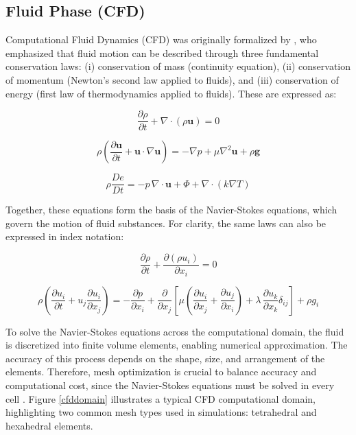 \subsection{Fluid Phase (CFD)}

Computational Fluid Dynamics (CFD) was originally formalized by \cite{Roache1972}, who emphasized that fluid motion can be described through three fundamental conservation laws: (i) conservation of mass (continuity equation), (ii) conservation of momentum (Newton's second law applied to fluids), and (iii) conservation of energy (first law of thermodynamics applied to fluids). These are expressed as:

\begin{equation}
    \frac{\partial \rho}{\partial t} + \nabla \cdot (\rho \mathbf{u}) = 0
\end{equation}

\begin{equation}
    \rho \left( \frac{\partial \mathbf{u}}{\partial t} + \mathbf{u} \cdot \nabla \mathbf{u} \right) 
    = -\nabla p + \mu \nabla^2 \mathbf{u} + \rho \mathbf{g}
\end{equation}

\begin{equation}
    \rho \frac{De}{Dt} = -p \, \nabla \cdot \mathbf{u} + \Phi + \nabla \cdot (k \nabla T)
\end{equation}

Together, these equations form the basis of the Navier-Stokes equations, which govern the motion of fluid substances. For clarity, the same laws can also be expressed in index notation:

\begin{equation}
\frac{\partial \rho}{\partial t} + \frac{\partial (\rho u_i)}{\partial x_i} = 0
\end{equation}

\begin{equation}
\rho\left(\frac{\partial u_i}{\partial t} + u_j \frac{\partial u_i}{\partial x_j}\right)
= -\frac{\partial p}{\partial x_i}
+ \frac{\partial}{\partial x_j}\!\left[\mu\left(\frac{\partial u_i}{\partial x_j}
+ \frac{\partial u_j}{\partial x_i}\right) + \lambda\,\frac{\partial u_k}{\partial x_k}\delta_{ij}\right]
+ \rho g_i
\end{equation}

To solve the Navier-Stokes equations across the computational domain, the fluid is discretized into finite volume elements, enabling numerical approximation. The accuracy of this process depends on the shape, size, and arrangement of the elements. Therefore, mesh optimization is crucial to balance accuracy and computational cost, since the Navier-Stokes equations must be solved in every cell \cite{eymard2000finite}. Figure \ref{cfddomain} illustrates a typical CFD computational domain, highlighting two common mesh types used in simulations: tetrahedral and hexahedral elements.

